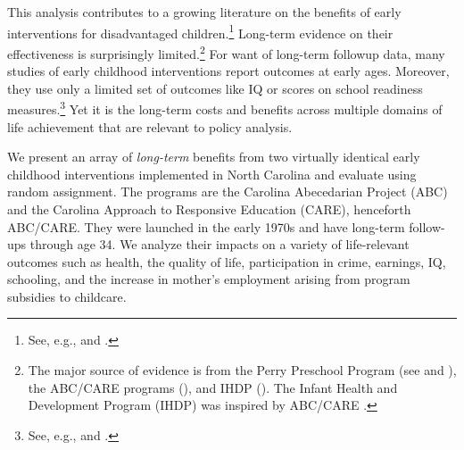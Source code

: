 This analysis contributes to a growing literature on the benefits of early interventions for disadvantaged children.\footnote{See, e.g., \cite{Currie_2011_AER} and \cite{Elango_Hojman_etal_2016_Early-Edu}.} Long-term evidence on their effectiveness is surprisingly limited.\footnote{The major source of evidence is from the Perry Preschool Program (see \citealp{Schweinhart_Montie_ea_2005_BOOKlifetime} and \citealp{Heckman_Moon_etal_2010_RateofReturn,Heckman_Moon_etal_2010_QE}), the ABC/CARE programs (\citealp{Ramey_Campbell_etal_2000_ADS,Ramey-etal_2012-ABC}), and IHDP (\citealp{Gross_Spiker_etal_1997_BOOKHelpinglowbirth,Duncan_Sojourner_2013_JHR}). The Infant Health and Development Program (IHDP) was inspired by ABC/CARE \citep[][]{Gross_Spiker_etal_1997_BOOKHelpinglowbirth}.} For want of long-term followup data, many studies of early childhood interventions report outcomes at early ages. Moreover, they use only a limited set of outcomes like IQ or scores on school readiness measures.\footnote{See, e.g., \cite{Kline_Walters_2014_EvaluatingPublicPrograms} and \cite{Weiland_2013_CD_Impacts-of-Pre-K}.} Yet it is the long-term costs and benefits across multiple domains of life achievement that are relevant to policy analysis.

We present an array of \emph{long-term} benefits from two virtually identical early childhood interventions implemented in North Carolina and evaluate using random assignment. The programs are the Carolina Abecedarian Project (ABC) and the Carolina Approach to Responsive Education (CARE), henceforth ABC/CARE. They were launched in the early 1970s and have long-term follow-ups through age 34. We analyze their impacts on a variety of life-relevant outcomes such as health, the quality of life, participation in crime, earnings, IQ, schooling, and the increase in mother's employment arising from program subsidies to childcare.

